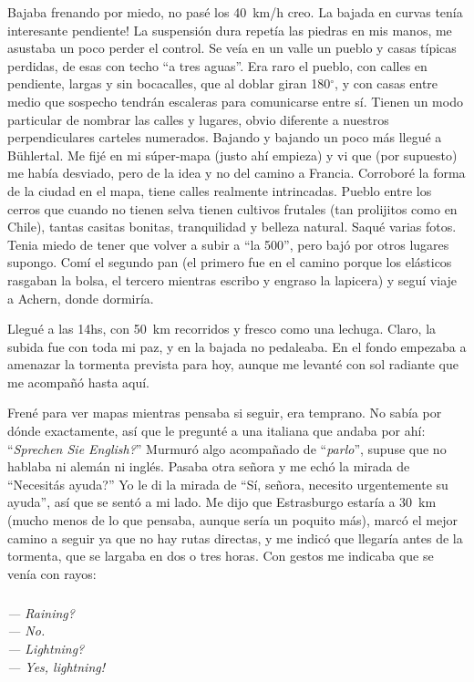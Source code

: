 Bajaba frenando por miedo, no pas\'e los 40~km/h creo. \textexclamdown La
bajada en curvas ten\'ia interesante pendiente! La suspensi\'on dura repet\'ia
las piedras en mis manos, me asustaba un poco perder el control. Se ve\'ia en
un valle un pueblo y casas t\'ipicas perdidas, de esas con techo ``a tres
aguas''. Era raro el pueblo, con calles en pendiente, largas y sin bocacalles,
que al doblar giran 180$^{\circ}$, y con casas entre medio que sospecho
tendr\'an escaleras para comunicarse entre s\'i. Tienen un modo particular de
nombrar las calles y lugares, obvio diferente a nuestros perpendiculares
carteles numerados. Bajando y bajando un poco m\'as llegu\'e a B\"uhlertal. Me
fij\'e en mi s\'uper-mapa (justo ah\'i empieza) y vi que (por supuesto) me
hab\'ia desviado, pero de la idea y no del camino a Francia. Corrobor\'e la
forma de la ciudad en el mapa, tiene calles realmente intrincadas. Pueblo
entre los cerros que cuando no tienen selva tienen cultivos frutales (tan
prolijitos como en Chile), tantas casitas bonitas, tranquilidad y belleza
natural. Saqu\'e varias fotos. Tenia miedo de tener que volver a subir a ``la
500'', pero baj\'o por otros lugares supongo. Com\'i el segundo pan (el
primero fue en el camino porque los el\'asticos rasgaban la bolsa, el tercero
mientras escribo y engraso la lapicera) y segu\'i viaje a Achern, donde
dormir\'ia.

Llegu\'e a las 14hs, con 50~km recorridos y fresco como una lechuga. Claro, la
subida fue con toda mi paz, y en la bajada no pedaleaba. En el fondo empezaba
a amenazar la tormenta prevista para hoy, aunque me levant\'e con sol radiante
que me acompa\~n\'o hasta aqu\'i.

Fren\'e para ver mapas mientras pensaba si seguir, era temprano. No sab\'ia
por d\'onde exactamente, as\'i que le pregunt\'e a una italiana que andaba por
ah\'i: ``\emph{Sprechen Sie English?}'' Murmur\'o algo acompa\~nado de
``\emph{parlo}'', supuse que no hablaba ni alem\'an ni ingl\'es. Pasaba otra
se\~nora y me ech\'o la mirada de ``\textquestiondown Necesit\'as ayuda?'' Yo
le di la mirada de ``S\'i, se\~nora, necesito urgentemente su ayuda'', as\'i
que se sent\'o a mi lado. Me dijo que Estrasburgo estar\'ia a 30~km (mucho
menos de lo que pensaba, aunque ser\'ia un poquito m\'as), marc\'o el mejor
camino a seguir ya que no hay rutas directas, y me indic\'o que llegar\'ia
antes de la tormenta, que se largaba en dos o tres horas. Con gestos me
indicaba que se ven\'ia con rayos:

\subparagraph{}\label{ssub:Tormenta} \emph{--- Raining?\\ --- No.\\ ---
Lightning?\\ --- Yes, lightning!}\\ \hangindent=1cm

